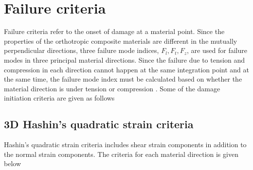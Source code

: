 \documentclass[12pt,a4paper,twoside,openright]{report}
\begin{document}
\section{Failure criteria}
\indent\indent\indent   Failure criteria refer to the onset of damage at a material point. Since the properties of the orthotropic composite materials are different in the mutually perpendicular directions, three failure mode indices, $F_{l}, F_{t}, F_{z}$, are used for failure modes in three principal material directions. Since the failure due to tension and compression in each direction cannot happen at the same integration point and at the same time, the failure mode index must be calculated based on whether the material direction is under tension or compression \citep{wang2009three}. Some of the damage initiation criteria are given as follows

\subsection{3D Hashin's quadratic strain criteria}\label{3D Hashin's quadratic strain criteria }
\indent\indent\indent Hashin's quadratic strain criteria \citep{wang2009three} includes shear strain components in addition to the normal strain components. The criteria for each material direction is given below 
\end{document}
